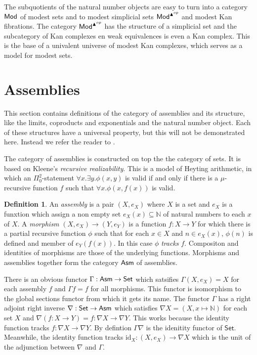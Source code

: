 \documentclass{amsart}
\theoremstyle{plain}
\theoremstyle{definition}
\newtheorem{defin}[theorem]{Definition}
\newcommand\hide[1]{}
\newcommand\id{\mathrm{id}}
\begin{document}
The subquotients of the natural number objects are easy to turn into a category $\mathsf{Mod}$ of modest sets and to modest simplicial sets $\mathsf{Mod}^{\blacktriangle^{op}}$ and modest Kan fibrations. The category $\mathsf{Mod}^{\blacktriangle^{op}}$ has the structure of a simplicial set and the subcategory of Kan complexes en weak equivalences is even a Kan complex. This is the base of a univalent universe of modest Kan complexes, which serves as a model for modest sets.

\section{Assemblies}
This section contains definitions of the category of assemblies and its structure, like the limits, coproducts and exponentials and the natural number object. Each of these structures have a universal property, but this will not be demonstrated here. Instead we refer the reader to \hide{cite: Jaap, eigen artikelen}.

The category of assemblies is constructed on top the the category of sets. It is based on Kleene's \emph{recursive realizability}. This is a model of Heyting arithmetic, in which an $\Pi^2_0$-statement $\forall x.\exists y.\phi(x,y)$ is valid if and only if there is a $\mu$-recursive function\hide{see wikipedia} $f$ such that $\forall x. \phi(x,f(x))$ is valid.

\newcommand\N{\mathbb N}
\newcommand\Set{\mathsf{Set}}
\begin{defin} An \emph{assembly} is a pair $(X,e_X)$ where $X$ is a set and $e_X$ is a funxtion which assign a non empty set $e_X(x)\subseteq \N$ of natural numbers to each $x$ of $X$. A \emph{morphism} $(X,e_X)\to (Y,e_Y)$ is a function $f:X\to Y$ for which there is a partial recursive function $\phi$ such that for each $x\in X$ and $n\in e_X(x)$, $\phi(n)$ is defined and member of $e_Y(f(x))$. In this case $\phi$ \emph{tracks} $f$. Compositon and identities of morphisms are those of the underlying functions. Morphisms and assemblies together form the category $\mathsf{Asm}$ of assemblies.
\end{defin}

There is an obvious functor $\Gamma:\asm\to\Set$ which satsifies $\Gamma(X,e_X)=X$ for each assembly $f$ and $\Gamma f = f$ for all morphisms. This functor is isomorphism to the global sections functor from which it gets its name. The functor $\Gamma$ has a right adjoint right inverse $\nabla:\Set\to\asm$ which satisfies $\nabla X = (X,x\mapsto\N)$ for each set $X$ and $\nabla (f:X\to Y) = f:\nabla X\to\nabla Y$. This works because the identity function tracks $f:\nabla X\to\nabla Y$. By defintion $\Gamma\nabla$ is the idenitity functor of $\Set$. Meanwhile, the identity function tracks $\id_X:(X,e_X) \to \nabla X$ which is the unit of the adjunction between $\nabla$ and $\Gamma$.
\end{document}
